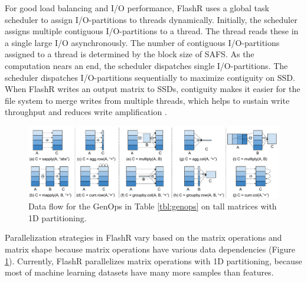For good load balancing and I/O performance, FlashR uses a global task scheduler
to assign I/O-partitions to threads dynamically. Initially, the scheduler assigns
multiple contiguous I/O-partitions to a thread. The thread reads these in
a single large I/O asynchronously. The number of contiguous I/O-partitions
assigned to a thread is determined by the block size of SAFS.
As the computation nears an end, the scheduler dispatches single I/O-partitions. 
The scheduler dispatches I/O-partitions sequentially to maximize contiguity
on SSD. When FlashR writes an output matrix to SSDs,
contiguity makes it easier for the file system to merge
writes from multiple threads, which helps to sustain write throughput and reduces
write amplification \cite{ripq}.

\begin{figure}
	\centering
	\includegraphics[scale=0.5]{FlashMatrix_figs/Parallelize.pdf}
	\vspace{-4pt}
	\caption{Data flow for the GenOps in Table \ref{tbl:genops} on tall matrices
	 with 1D partitioning.}
	\label{fig:parallel}
  \vspace{-8pt}
\end{figure}

Parallelization strategies in FlashR vary based on the matrix operations
and matrix shape because matrix operations have various data dependencies
(Figure \ref{fig:parallel}). Currently, FlashR parallelizes matrix operations
with 1D partitioning, because most of machine learning datasets have many more
samples than features.

